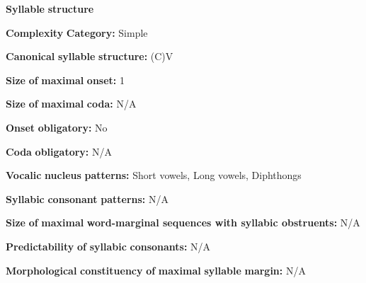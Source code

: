 \documentclass[output=paper]{langsci/langscibook}
\begin{document}
\begin{styleBody}
\textbf{Syllable} \textbf{structure}
\end{styleBody}

\begin{styleBody}
\textbf{Complexity} \textbf{Category:} Simple
\end{styleBody}

\begin{styleBody}
\textbf{Canonical} \textbf{syllable} \textbf{structure:} (C)V \citep[93-95]{Wojtylak2017}
\end{styleBody}

\begin{styleBody}
\textbf{Size} \textbf{of} \textbf{maximal} \textbf{onset:} 1
\end{styleBody}

\begin{styleBody}
\textbf{Size} \textbf{of} \textbf{maximal} \textbf{coda:} N/A
\end{styleBody}

\begin{styleBody}
\textbf{Onset} \textbf{obligatory:} No
\end{styleBody}

\begin{styleBody}
\textbf{Coda} \textbf{obligatory:} N/A
\end{styleBody}

\begin{styleBody}
\textbf{Vocalic} \textbf{nucleus} \textbf{patterns:} Short vowels, Long vowels, Diphthongs
\end{styleBody}

\begin{styleBody}
\textbf{Syllabic} \textbf{consonant} \textbf{patterns:} N/A
\end{styleBody}

\begin{styleBody}
\textbf{Size} \textbf{of} \textbf{maximal} \textbf{word{}-marginal sequences with syllabic obstruents:} N/A
\end{styleBody}

\begin{styleBody}
\textbf{Predictability} \textbf{of} \textbf{syllabic} \textbf{consonants:} N/A
\end{styleBody}

\begin{styleBody}
\textbf{Morphological} \textbf{constituency} \textbf{of} \textbf{maximal} \textbf{syllable} \textbf{margin:} N/A
\end{styleBody}
\end{document}
